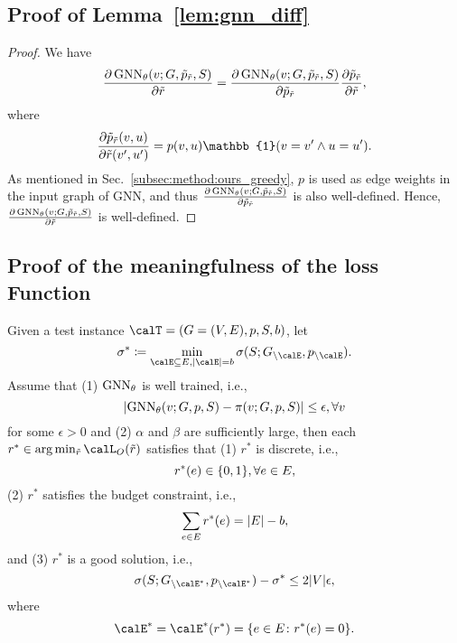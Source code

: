 \subsection{Proof of Lemma~\ref{lem:gnn_diff}}\label{app:proof:gnn_diff}
\begin{proof}
We have
\[
\frac{\partial \operatorname{GNN}_{\theta}(v; G, \Tilde{p}_{\Tilde{r}}, S)}{\partial \Tilde{r}} = \frac{\partial \operatorname{GNN}_{\theta}(v; G, \Tilde{p}_{\Tilde{r}}, S)}{\partial \Tilde{p}_{\Tilde{r}}} \frac{\partial \Tilde{p}_{\Tilde{r}}}{\partial \Tilde{r}},
\]
    where    
    \[
    \frac{\partial \Tilde{p}_{\Tilde{r}}(v, u)}{\partial \Tilde{r}(v', u')} = p(v, u) \mathbb{1}(v = v' \land u = u').
    \]    
    As mentioned in Sec.~\ref{subsec:method:ours_greedy}, $p$ is used as edge weights in the input graph of GNN, and thus $\frac{\partial \operatorname{GNN}_{\theta}(v; G, \Tilde{p}_{\Tilde{r}}, S)}{\partial \Tilde{p}_{\Tilde{r}}}$ is also well-defined.
    Hence, $\frac{\partial \operatorname{GNN}_{\theta}(v; G, \Tilde{p}_{\Tilde{r}}, S)}{\partial \Tilde{r}}$ is well-defined.
\end{proof}

\subsection{Proof of the meaningfulness of the loss Function}\label{app:proof:relax_good}
\begin{lemma}\label{lem:relax_good}
    Given a test instance $\calT = (G = (V, E), p, S, b)$, let 
    \[
    \sigma^* \coloneqq \min_{\calE \subseteq E, \Abs{\calE} = b} \sigma(S; G_{\setminus \calE}, p_{\setminus \calE}).
    \]
    Assume that 
    (1) $\operatorname{GNN}_\theta$ is well trained, i.e.,
    \[
    \lvert \operatorname{GNN}_\theta(v; G, p, S) - \pi(v; G, p, S) \rvert \leq \epsilon, \forall v
    \]
    for some $\epsilon > 0$ and
    (2) $\alpha$ and $\beta$ are sufficiently large,
    then each $r^* \in \arg \min_{\Tilde{r}} \calL_O(\Tilde{r})$ satisfies that
    (1) $r^*$ is discrete, 
    i.e., 
    \[
    r^*(e) \in \{0, 1\}, \forall e \in E,
    \]
    (2) $r^*$ satisfies the budget constraint,
    i.e.,
    \[
    \sum_{e \in E} r^*(e) = \lvert E \rvert - b,
    \]
    and
    (3) $r^*$ is a good solution, i.e., 
    \[
    \sigma(S; G_{\setminus \calE^*}, p_{\setminus \calE^*}) - \sigma^* \leq 2\Abs{V}\epsilon,
    \]
    where 
    \[
    \calE^* = \calE^*(r^*) = \Set{e \in E \colon r^*(e) = 0}.
    \]
\end{lemma}

